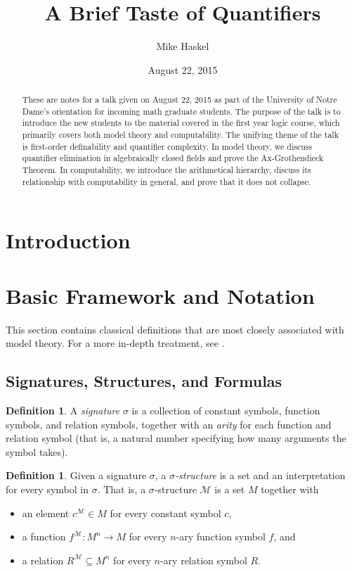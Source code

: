 \documentclass{article}
\title{A Brief Taste of Quantifiers}
\author{Mike Haskel}
\date{August 22, 2015}
\theoremstyle{plain}
\theoremstyle{definition}
\newtheorem{defn}[thm]{Definition}
\newcommand{\defterm}{\emph}
\begin{document}
\maketitle

\begin{abstract}
  These are notes for a talk given on August 22, 2015 as part of the
  University of Notre Dame's orientation for incoming math graduate
  students. The purpose of the talk is to introduce the new students
  to the material covered in the first year logic course, which
  primarily covers both model theory and computability. The unifying
  theme of the talk is first-order definability and quantifier
  complexity. In model theory, we discuss quantifier elimination in
  algebraically closed fields and prove the Ax-Grothendieck
  Theorem. In computability, we introduce the arithmetical hierarchy,
  discuss its relationship with computability in general, and prove
  that it does not collapse.
\end{abstract}

\section{Introduction}

\section{Basic Framework and Notation}

This section contains classical definitions that are most closely
associated with model theory. For a more in-depth treatment, see
\cite{marker}.

\subsection{Signatures, Structures, and Formulas}

\begin{defn}
  A \defterm{signature} $\sigma$ is a collection of constant symbols,
  function symbols, and relation symbols, together with an
  \defterm{arity} for each function and relation symbol (that is, a
  natural number specifying how many arguments the symbol takes).
\end{defn}

\begin{defn}
  Given a signature $\sigma$, a \defterm{$\sigma$-structure} is a set
  and an interpretation for every symbol in $\sigma$. That is, a
  $\sigma$-structure $\mathcal{M}$ is a set $M$ together with
  \begin{itemize}
  \item an element $c^\mathcal{M} \in M$ for every constant symbol $c$,
  \item a function $f^\mathcal{M} : M^n \to M$ for every $n$-ary function symbol $f$, and
  \item a relation $R^\mathcal{M} \subseteq M^n$ for every $n$-ary relation symbol $R$.
  \end{itemize}
\end{defn}
\end{document}
